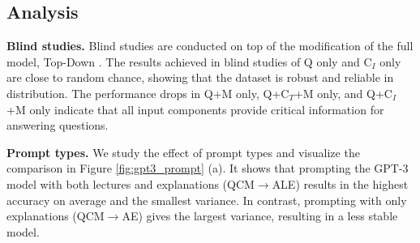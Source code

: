 \begin{table}[ht]
\centering
\fontsize{8.5pt}{\baselineskip}\selectfont \renewcommand\tabcolsep{2.0pt} \renewcommand\arraystretch{1.0} 
\vspace{1mm}
\caption{Automatic metrics (, , Similarity) and human evaluation of generated explanations. Note that a gold explanation refers to one that is relevant, correct, and complete.}
\label{tab:explanation_evaluation}
\end{table}

\subsection{Analysis}
\label{sec:analysis}
\textbf{Blind studies.} Blind studies are conducted on top of the modification of the full model, Top-Down \cite{Anderson2017up}. The results achieved in blind studies of Q only and C$_I$ only are close to random chance, showing that the \name{} dataset is robust and reliable in distribution. The performance drops in Q+M only, Q+C$_T$+M only, and Q+C$_I$+M only indicate that all input components provide critical information for answering \name{} questions.

\textbf{Prompt types.} We study the effect of prompt types and visualize the comparison in Figure \ref{fig:gpt3_prompt} (a). It shows that prompting the GPT-3 model with both lectures and explanations (QCM$\rightarrow$ALE) results in the highest accuracy on average and the smallest variance. In contrast, prompting with only explanations (QCM$\rightarrow$AE) gives the largest variance, resulting in a less stable model.

